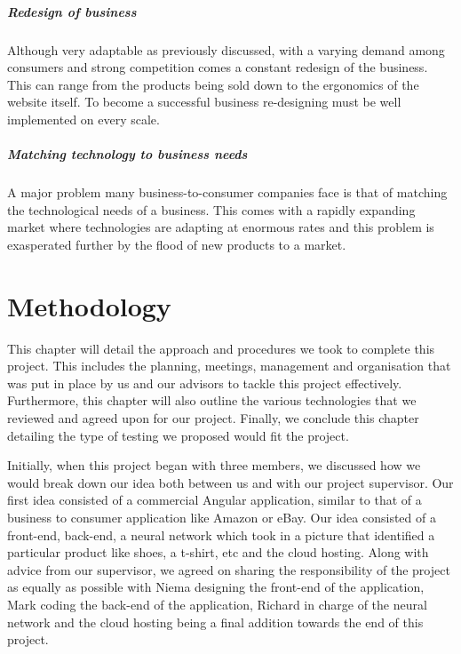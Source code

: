 \paragraph{Redesign of business}Although very adaptable as previously discussed, with a varying demand among consumers and strong competition comes a constant redesign of the business. This can range from the products being sold down to the ergonomics of the website itself. To become a successful business re-designing must be well implemented on every scale.

\paragraph{Matching technology to business needs}A major problem many business-to-consumer companies face is that of matching the technological needs of a business. This comes with a rapidly expanding market where technologies are adapting at enormous rates and this problem is exasperated further by the flood of new products to a market.

\chapter{Methodology}
This chapter will detail the approach and procedures we took to complete this project. This includes the planning, meetings, management and organisation that was put in place by us and our advisors to tackle this project effectively. Furthermore, this chapter will also outline the various technologies that we reviewed and agreed upon for our project. Finally, we conclude this chapter detailing the type of testing we proposed would fit the project.

Initially, when this project began with three members, we discussed how we would break down our idea both between us and with our project supervisor. Our first idea consisted of a commercial Angular application, similar to that of a business to consumer application like Amazon or eBay. Our idea consisted of a front-end, back-end, a neural network which took in a picture that identified a particular product like shoes, a t-shirt, etc and the cloud hosting. Along with advice from our supervisor,  we agreed on sharing the responsibility of the project as equally as possible with Niema designing the front-end of the application, Mark coding the back-end of the application, Richard in charge of the neural network and the cloud hosting being a final addition towards the end of this project.

